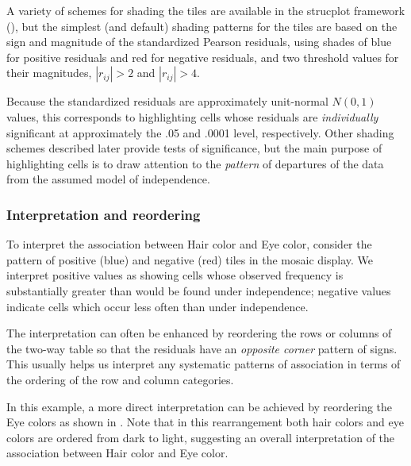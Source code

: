 \documentclass[10pt,krantz2]{krantz}\usepackage[]{graphicx}\usepackage[]{color}
\begin{document}
A variety of schemes for shading the tiles are available in the
strucplot framework (),
but the simplest (and default) shading patterns for the tiles are based on
the sign and magnitude of the
standardized Pearson residuals, using shades of blue for positive residuals
and red for negative residuals, and two threshold values for their magnitudes,
$|r_{ij}| > 2$ and $|r_{ij}| > 4$.

Because the standardized residuals are approximately unit-normal $N(0,1)$
values,  this corresponds to highlighting cells whose
residuals are \emph{individually} significant at approximately
the .05 and .0001 level, respectively.
Other shading schemes described later provide tests of significance,
but the main purpose  of highlighting cells is to draw attention to the \emph{pattern}
of departures of the data from the assumed model of independence.

\subsubsection{Interpretation and reordering}

To interpret the association between Hair color and Eye color,
consider the pattern of positive (blue) and negative (red)
tiles in the mosaic display.
We interpret positive values as showing cells whose observed frequency
is substantially greater than would be found under independence;
negative values indicate cells which occur less often than
under independence.

The interpretation can often be enhanced by reordering the rows or columns
of the two-way table so that the residuals have an \emph{opposite
corner} pattern of signs.  This usually helps us interpret any systematic
patterns of association in terms of the ordering of the row and column
categories.

In this example, a more direct interpretation can be achieved by
reordering the Eye colors as shown in
.
Note that in this rearrangement
both hair colors and eye colors are ordered from dark to light,
suggesting an overall interpretation of the association
between Hair color and Eye color.
\end{document}

